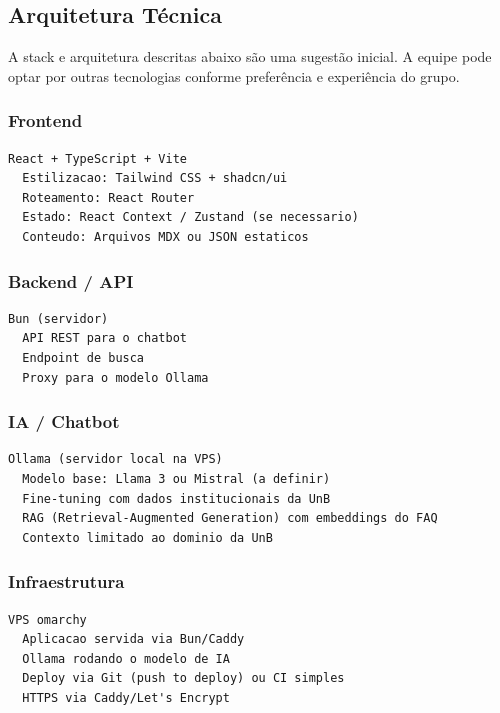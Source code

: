 \documentclass[12pt, a4paper]{article}
\begin{document}
\subsection{Arquitetura Técnica}

\begin{notabox}
A stack e arquitetura descritas abaixo são uma sugestão inicial. A equipe pode optar por outras tecnologias conforme preferência e experiência do grupo.
\end{notabox}

\subsubsection{Frontend}

\begin{lstlisting}
React + TypeScript + Vite
  Estilizacao: Tailwind CSS + shadcn/ui
  Roteamento: React Router
  Estado: React Context / Zustand (se necessario)
  Conteudo: Arquivos MDX ou JSON estaticos
\end{lstlisting}

\subsubsection{Backend / API}

\begin{lstlisting}
Bun (servidor)
  API REST para o chatbot
  Endpoint de busca
  Proxy para o modelo Ollama
\end{lstlisting}

\subsubsection{IA / Chatbot}

\begin{lstlisting}
Ollama (servidor local na VPS)
  Modelo base: Llama 3 ou Mistral (a definir)
  Fine-tuning com dados institucionais da UnB
  RAG (Retrieval-Augmented Generation) com embeddings do FAQ
  Contexto limitado ao dominio da UnB
\end{lstlisting}

\subsubsection{Infraestrutura}

\begin{lstlisting}
VPS omarchy
  Aplicacao servida via Bun/Caddy
  Ollama rodando o modelo de IA
  Deploy via Git (push to deploy) ou CI simples
  HTTPS via Caddy/Let's Encrypt
\end{lstlisting}
\end{document}
